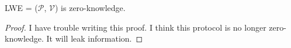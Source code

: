 \begin{lemma}
\label{lemma:lwezk}

LWE = ($\mathcal{P}$, $\mathcal{V}$) is zero-knowledge.

\end{lemma}
\begin{proof}

I have trouble writing this proof. I think this protocol is no longer zero-knowledge. It will leak information.


    
    
    
    
    




\end{proof}

